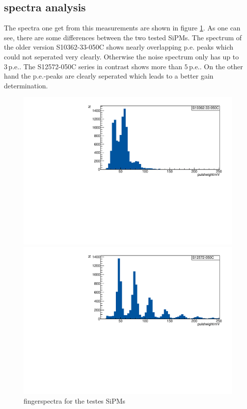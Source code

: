 \subsection{spectra analysis}
The spectra one get from this measurements are shown in figure \ref{fingerspecs}. As one can see, there are some differences between the two tested SiPMs. The spectrum of the older version S10362-33-050C shows nearly overlapping p.e. peaks which could not seperated very clearly. Otherwise the noise spectrum only has up to $3\,\mathrm{p.e.}$. The S12572-050C series in contrast shows more than $5\,\mathrm{p.e.}$. On the other hand the p.e.-peaks are clearly seperated which leads to a better gain determination.
\begin{figure}[h]
	\centering
	\begin{minipage}[b]{0.49\textwidth}
		\includegraphics[width = .99\textwidth]{Figures/radermacher/S10362-33-050C.pdf}
	\end{minipage}
	\begin{minipage}[b]{0.49\textwidth}
		\includegraphics[width = .99\textwidth]{Figures/radermacher/S12572-050C.pdf}
	\end{minipage}
	\caption{fingerspectra for the testes SiPMs}
	\label{fingerspecs}
\end{figure}
